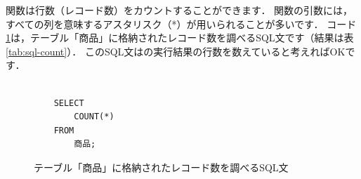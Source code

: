 関数は行数（レコード数）をカウントすることができます．
関数の引数には，すべての列を意味するアスタリスク（*）が用いられることが多いです．
コード\ref{code:sql-count}は，テーブル「商品」に格納されたレコード数を調べるSQL文です（結果は表\ref{tab:sql-count}）．
このSQL文はの実行結果の行数を数えていると考えればOKです．
\begin{figure}[!htbp]
    \begin{verbatim}

    SELECT
        COUNT(*)
    FROM
        商品;

    \end{verbatim}
    \captionsetup{name=コード}
    \caption{テーブル「商品」に格納されたレコード数を調べるSQL文}
    \label{code:sql-count}
\end{figure}
\begin{table}[!htbp]
    \centering
    \caption{テーブル「商品」に格納されたレコード数を調べた結果}
    \label{tab:sql-count}
\end{table}

